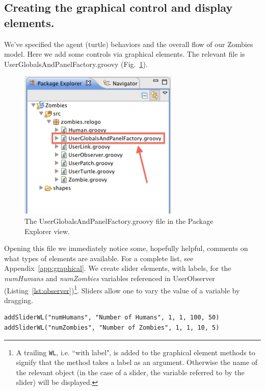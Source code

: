 \documentclass[11pt]{amsart}
\begin{document}
\subsection{Creating the graphical control and display elements.}
We've specified the agent (turtle) behaviors and the overall flow of our Zombies model. Here we add some controls via graphical elements. The relevant file is UserGlobalsAndPanelFactory.groovy (Fig.~\ref{fig:ugapf}).

\begin{figure}
\begin{center}
\vspace{.2in}
\centerline {
\includegraphics[width=3in]{GettingStartedImages/UserGlobalsAndPanelFactory.png}
}
\caption{The UserGlobalsAndPanelFactory.groovy file in the Package Explorer view.}
\label{fig:ugapf}
\end{center}
\end{figure}

Opening this file we immediately notice some, hopefully helpful, comments on what types of elements are available. For a complete list, see Appendix~\ref{app:graphical}. We create slider elements, with labels, for the \emph{numHumans} and \emph{numZombies} variables referenced in UserObserver (Listing~\ref{lst:observer})\footnote{A trailing \texttt{WL}, i.e. ``with label", is added to the graphical element methods to signify that the method takes a label as an argument. Otherwise the name of the relevant object (in the case of a slider, the variable referred to by the slider) will be displayed.}. Sliders allow one to vary the value of a variable by dragging.

\noindent\begin{minipage}[h]{\textwidth}
\vspace{.2in}
\lstset{language=java, numbers=none}
\begin{lstlisting}
addSliderWL("numHumans", "Number of Humans", 1, 1, 100, 50)
addSliderWL("numZombies", "Number of Zombies", 1, 1, 10, 5)
\end{lstlisting}
\vspace{.2in}
\end{minipage}
\end{document}
